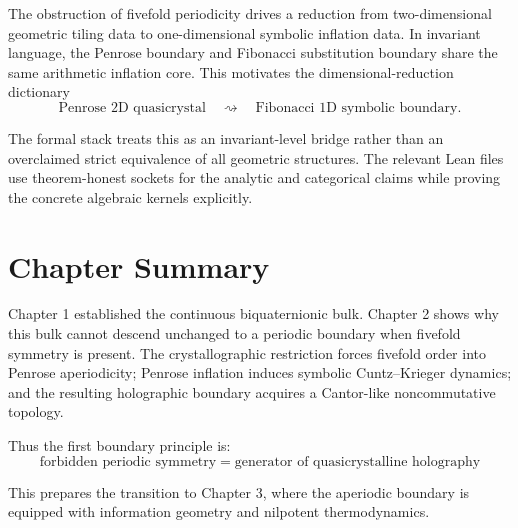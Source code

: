 The obstruction of fivefold periodicity drives a reduction from two-dimensional geometric tiling data to one-dimensional symbolic inflation data.  In invariant language, the Penrose boundary and Fibonacci substitution boundary share the same arithmetic inflation core.  This motivates the dimensional-reduction dictionary
\begin{equation}
    \text{Penrose 2D quasicrystal}
    \quad\rightsquigarrow\quad
    \text{Fibonacci 1D symbolic boundary}.
\end{equation}

The formal stack treats this as an invariant-level bridge rather than an overclaimed strict equivalence of all geometric structures.  The relevant Lean files use theorem-honest sockets for the analytic and categorical claims while proving the concrete algebraic kernels explicitly.

\section{Chapter Summary}

Chapter 1 established the continuous biquaternionic bulk.  Chapter 2 shows why this bulk cannot descend unchanged to a periodic boundary when fivefold symmetry is present.  The crystallographic restriction forces fivefold order into Penrose aperiodicity; Penrose inflation induces symbolic Cuntz--Krieger dynamics; and the resulting holographic boundary acquires a Cantor-like noncommutative topology.

Thus the first boundary principle is:
\begin{equation}
    \boxed{
    \text{forbidden periodic symmetry}
    \;=\;
    \text{generator of quasicrystalline holography}
    }
\end{equation}

This prepares the transition to Chapter 3, where the aperiodic boundary is equipped with information geometry and nilpotent thermodynamics.
